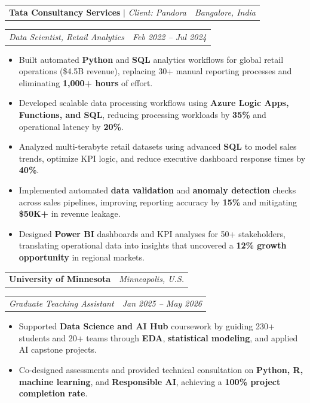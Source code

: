 \documentclass[10pt,letterpaper]{article}
\makeatletter
\newcommand{\roleonly}[2]{%
  \noindent
  \begin{tabularx}{\linewidth}{@{}X r@{}}
    \textit{#1} & \textit{#2}
  \end{tabularx}\vspace{0pt}%
}
\newcommand{\entrysep}{\vspace{2pt}}
\makeatother
\begin{document}
\entrysep

\noindent \begin{tabularx}{\linewidth}{@{} X r@{} }
{\fontsize{11pt}{13pt}\selectfont \textbf{Tata Consultancy Services} $|$ \textit{Client: Pandora}} & \textit{Bangalore, India} 
\end{tabularx}\vspace{-2pt}
\roleonly{Data Scientist, Retail Analytics}{Feb 2022 -- Jul 2024 }
\begin{itemize}
  \item Built automated \textbf{Python} and \textbf{SQL} analytics workflows for global retail operations (\$4.5B revenue), replacing 30+ manual reporting processes and eliminating \textbf{1,000+ hours} of effort.
  \item Developed scalable data processing workflows using \textbf{Azure Logic Apps, Functions, and SQL}, reducing processing workloads by \textbf{35\%} and operational latency by \textbf{20\%}.
  \item Analyzed multi-terabyte retail datasets using advanced \textbf{SQL} to model sales trends, optimize KPI logic, and reduce executive dashboard response times by \textbf{40\%}.
  \item Implemented automated \textbf{data validation} and \textbf{anomaly detection} checks across sales pipelines, improving reporting accuracy by \textbf{15\%} and mitigating \textbf{\$50K+} in revenue leakage.
  \item Designed \textbf{Power BI} dashboards and KPI analyses for 50+ stakeholders, translating operational data into insights that uncovered a \textbf{12\% growth opportunity} in regional markets.
\end{itemize}
\entrysep

\noindent \begin{tabularx}{\linewidth}{@{} X r@{} }
{\fontsize{11pt}{13pt}\selectfont \textbf{University of Minnesota}} & \textit{Minneapolis, U.S.} 
\end{tabularx}\vspace{-2pt}
\roleonly{Graduate Teaching Assistant}{Jan 2025 -- May 2026 }
\begin{itemize}
  \item Supported \textbf{Data Science and AI Hub} coursework by guiding 230+ students and 20+ teams through \textbf{EDA}, \textbf{statistical modeling}, and applied AI capstone projects.
  \item Co-designed assessments and provided technical consultation on \textbf{Python, R, machine learning}, and \textbf{Responsible AI}, achieving a \textbf{100\% project completion rate}.
\end{itemize}
\end{document}
